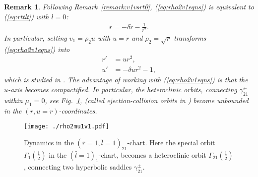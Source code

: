 \documentclass[reqno,12pt]{amsart}
\renewcommand{\eqref}[1]{(\ref{eq:#1})}
\newcommand{\figref}[1]{Fig.~\ref{fig:#1}}
\newcommand{\figlab}[1]{\label{fig:#1}}
\newcommand{\remref}[1]{Remark~\ref{remark:#1}}
\newcommand{\remlab}[1]{\label{remark:#1}}
\newtheorem{remark}[theorem]{Remark}
\numberwithin{equation}{section}
\begin{document}
\begin{remark} \remlab{v1vsrt}
Following \remref{v1vsrt0}, \eqref{rho2v1eqns} is equivalent to \eqref{rttlt} with $l=0$:
\begin{align*}
 \ddot r = -\delta \dot r -\frac{1}{r^2}.
\end{align*}
In particular, setting $v_1=\rho_2 u$ with $u=\dot r$ and $\rho_2=\sqrt{r}$ transforms \eqref{rho2v1eqns} into
\begin{align*}
  r' &=ur^2,\\
 u'&=-\delta u r^2 -1,
\end{align*}
which is studied in \cite[Proposition 3.1]{margheri2017a}. The advantage of working with \eqref{rho2v1eqns} is that the $u$-axis becomes compactified. In particular, the heteroclinic orbits, connecting $\gamma_{21}^\pm$ within $\mu_1=0$, see \figref{rho2mu1v1}, (called ejection-collision orbits in \cite{margheri2014a}) become unbounded in the $(r,u=\dot r)$-coordinates. 
\end{remark}


\begin{figure}[h!]
 	\begin{center}
 		{\texttt{[image: ./rho2mu1v1.pdf]}}
 		\caption{Dynamics in the $(\bar r=1,\bar l=1)_{21}$-chart. Here the special orbit $\Gamma_1\!\left(\frac12\right)$ in the $(\bar l=1)_1$-chart, becomes a heteroclinic orbit $\Gamma_{21}\!\left(\frac12\right)$, connecting two hyperbolic saddles $\gamma_{21}^\pm$.}\figlab{rho2mu1v1}
 	\end{center}
 \end{figure}
\end{document}
